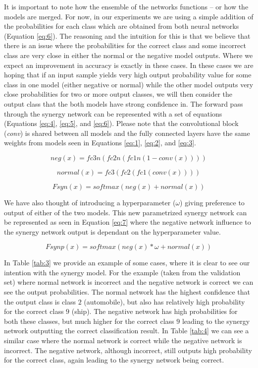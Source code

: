 \documentclass[b5paper]{book}
\begin{document}
It is important to note how the ensemble of the networks functions -- or how the models are merged. For now, in our experiments we are using a simple addition of the probabilities for each class which are obtained from both neural networks (Equation \ref{eq:6}). The reasoning and the intuition for this is that we believe that there is an issue where the probabilities for the correct class and some incorrect class are very close in either the normal or the negative model outputs. Where we expect an improvement in accuracy is exactly in these cases. In these cases we are hoping that if an input sample yields very high output probability value for some class in one model (either negative or normal) while the other model outputs very close probabilities for two or more output classes, we will then consider the output class that the both models have strong confidence in. The forward pass through the synergy network can be represented with a set of equations (Equations \ref{eq:4}, \ref{eq:5}, and \ref{eq:6}). Please note that the convolutional block (\emph{conv}) is shared between all models and the fully connected layers have the same weights from models seen in Equations \ref{eq:1}, \ref{eq:2}, and \ref{eq:3}.

\begin{equation}\label{eq:4}
neg(x) = fc3n(fc2n(fc1n(1 - conv(x))))
\end{equation}

\begin{equation}\label{eq:5}
normal(x) = fc3(fc2(fc1(conv(x))))
\end{equation}

\begin{equation}\label{eq:6}
Fsyn(x) = softmax(neg(x) + normal(x))
\end{equation}

We have also thought of introducing a hyperparameter (\(\omega\)) giving preference to output of either of the two models. This new parametrized synergy network can be represented as seen in Equation \ref{eq:7} where the negative network influence to the synergy network output is dependant on the hyperparameter value.

\begin{equation}\label{eq:7}
Fsynp(x) = softmax(neg(x) * \omega + normal(x))
\end{equation}

In Table \ref{tab:3} we provide an example of some cases, where it is clear to see our intention with the synergy model. For the example (taken from the validation set) where normal network is incorrect and the negative network is correct we can see the output probabilities. The normal network has the highest confidence that the output class is class \(2\) (automobile), but also has relatively high probability for the correct class \(9\) (ship). The negative network has high probabilities for both these classes, but much higher for the correct class \(9\) leading to the synergy network outputting the correct classification result. In Table \ref{tab:4} we can see a similar case where the normal network is correct while the negative network is incorrect. The negative network, although incorrect, still outputs high probability for the correct class, again leading to the synergy network being correct.
\end{document}
